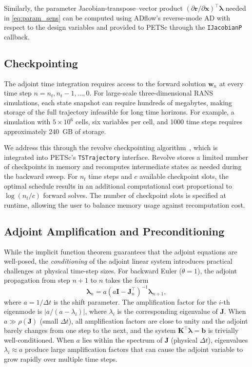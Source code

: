 \documentclass[journal]{new-aiaa}
\newcommand{\mb}[1]{\mathbf{#1}}
\newcommand{\mbg}[1]{\bm{#1}}
\newcommand{\p}{\partial}
\begin{document}
Similarly, the parameter Jacobian-transpose--vector product $(\p \mb{r}/\p \mb{x})^\intercal \mbg{\lambda}$ needed in \cref{eq:param_sens} can be computed using ADflow's reverse-mode AD with respect to the design variables and provided to PETSc through the \texttt{IJacobianP} callback.

\subsection{Checkpointing}\label{sec:checkpointing}
The adjoint time integration requires access to the forward solution $\mb{w}_n$ at every time step $n = n_t, n_t-1, \ldots, 0$.
For large-scale three-dimensional RANS simulations, each state snapshot can require hundreds of megabytes, making storage of the full trajectory infeasible for long time horizons.
For example, a simulation with $5 \times 10^6$ cells, six variables per cell, and 1000 time steps requires approximately 240~GB of storage.

We address this through the revolve checkpointing algorithm~\cite{Griewank2000}, which is integrated into PETSc's \texttt{TSTrajectory} interface.
Revolve stores a limited number of checkpoints in memory and recomputes intermediate states as needed during the backward sweep.
For $n_t$ time steps and $c$ available checkpoint slots, the optimal schedule results in an additional computational cost proportional to $\log(n_t / c)$ forward solves.
The number of checkpoint slots is specified at runtime, allowing the user to balance memory usage against recomputation cost.

\subsection{Adjoint Amplification and Preconditioning}\label{sec:adjoint_amplification}
While the implicit function theorem guarantees that the adjoint equations are well-posed, the \emph{conditioning} of the adjoint linear system introduces practical challenges at physical time-step sizes.
For backward Euler ($\theta = 1$), the adjoint propagation from step $n+1$ to $n$ takes the form
\begin{equation}\label{eq:adjoint_amplification}
\mbg{\lambda}_{n} = a \left(a\mb{I} - \mb{J}_n^{\intercal}\right)^{-1} \mbg{\lambda}_{n+1},
\end{equation}
where $a = 1/\Delta t$ is the shift parameter.
The amplification factor for the $i$-th eigenmode is $|a / (a - \lambda_i)|$, where $\lambda_i$ is the corresponding eigenvalue of $\mb{J}$.
When $a \gg \rho(\mb{J})$ (small $\Delta t$), all amplification factors are close to unity and the adjoint barely changes from one step to the next, and the system $\mb{K}^\intercal \mbg{\lambda} = \mb{b}$ is trivially well-conditioned.
When $a$ lies within the spectrum of $\mb{J}$ (physical $\Delta t$), eigenvalues $\lambda_i \approx a$ produce large amplification factors that can cause the adjoint variable to grow rapidly over multiple time steps.
\end{document}
